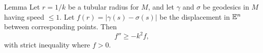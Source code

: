\begin{thm}{Lemma}\label{lem:diff-inequality} Let $r = 1/k$ be a tubular radius for $M$, and let $\gamma$ and $\sigma$ be
geodesics in $M$ having speed $\le 1$. Let $f(r) = |\gamma(s) - \sigma(s)|$ be the
displacement in $\mathbb{E}^n$ between corresponding points. Then 
$$f'' \ge -k^2f,$$ with strict inequality where $f> 0$.
\end{thm}


%
%
%
%
%

